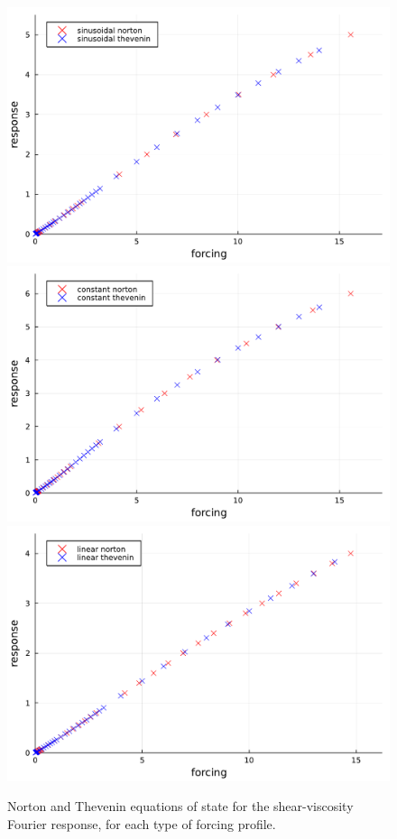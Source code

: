   \begin{figure}[htbp]
    \begin{center}
      \includegraphics[width=0.75\linewidth]{figures/sinusoidal_joint.pdf}
      \includegraphics[width=0.75\linewidth]{figures/constant_joint.pdf}
      \includegraphics[width=0.75\linewidth]{figures/linear_joint.pdf}
      \caption{ \label{fig:norton_sv_nonlinear_response}
        Norton and Thevenin equations of state for the shear-viscosity Fourier response, for each type of forcing profile.
      }
    \end{center}
  \end{figure}
